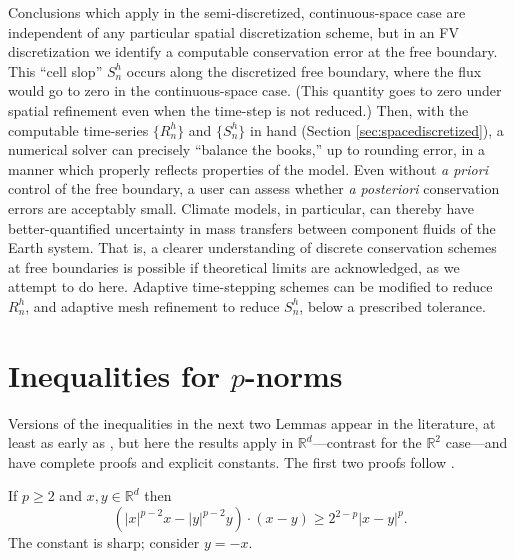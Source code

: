 \documentclass[final,onefignum]{siamart190516}
\newcommand\RR{\mathbb{R}}
\begin{document}
Conclusions which apply in the semi-discretized, continuous-space case are independent of any particular spatial discretization scheme, but in an FV discretization we identify a computable conservation error at the free boundary.  This ``cell slop'' $S_n^h$ occurs along the discretized free boundary, where the flux would go to zero in the continuous-space case.  (This quantity goes to zero under spatial refinement even when the time-step is not reduced.)  Then, with the computable time-series $\{R_n^h\}$ and $\{S_n^h\}$ in hand (Section \ref{sec:spacediscretized}), a numerical solver can precisely ``balance the books,'' up to rounding error, in a manner which properly reflects properties of the model.  Even without \emph{a priori} control of the free boundary, a user can assess whether \emph{a posteriori} conservation errors are acceptably small.  Climate models, in particular, can thereby have better-quantified uncertainty in mass transfers between component fluids of the Earth system.  That is, a clearer understanding of discrete conservation schemes at free boundaries is possible if theoretical limits are acknowledged, as we attempt to do here.  Adaptive time-stepping schemes can be modified to reduce $R_n^h$, and adaptive mesh refinement to reduce $S_n^h$, below a prescribed tolerance.






\appendix

\section{Inequalities for $p$-norms}   \label{app:pinequalities}  Versions of the inequalities in the next two Lemmas appear in the literature, at least as early as \cite{GlowinskiMarroco1975}, but here the results apply in $\RR^d$---contrast \cite{BarrettLiu1993,GlowinskiMarroco1975} for the $\RR^2$ case---and have complete proofs and explicit constants.  The first two proofs follow \cite[Appendix A]{Peral1997}.

\begin{lemma}  \label{lem:pbiginequality}  If $p\ge 2$ and $x,y\in\RR^d$ then
\begin{equation}
\left(|x|^{p-2} x - |y|^{p-2} y\right)\cdot(x-y) \ge 2^{2-p} |x-y|^p. \label{eq:pbiginequality}
\end{equation}
The constant is sharp; consider $y=-x$.
\end{lemma}
\end{document}
